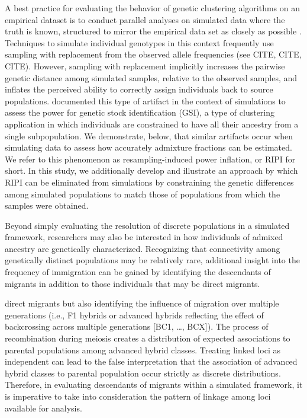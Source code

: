 A best practice for evaluating the behavior of genetic clustering algorithms on an empirical dataset is to conduct
parallel analyses on simulated data where the truth is known, structured to mirror the empirical data set
as closely as possible \citep{vaha2006efficiency,anderson2008improved,latch2011fine}.
Techniques to simulate individual genotypes in this context frequently use sampling with replacement from the 
observed allele frequencies (see CITE, CITE, CITE).
However, sampling with replacement implicitly increases the pairwise genetic distance among simulated samples, relative to the observed samples, and 
inflates the perceived ability to correctly assign individuals back to source populations. \citet{anderson2008improved}
documented this type of artifact in the context of simulations to assess the power for
genetic stock identification (GSI), a type of clustering application in which individuals are constrained to have
all their ancestry from a single subpopulation. We demonstrate, below, that similar artifacts occur when simulating data to 
assess how accurately admixture fractions can be estimated.  We refer to this phenomenon as resampling-induced
power inflation, or RIPI for short.  
In this study, we additionally develop and illustrate an approach by which RIPI can be eliminated
from simulations by constraining the genetic differences among simulated populations to match
those of populations from which the samples were obtained. 

Beyond simply evaluating the resolution of discrete populations in a simulated framework, researchers may also be 
interested in how individuals of admixed ancestry are genetically characterized.
Recognizing that connectivity among genetically distinct populations may be relatively rare, additional insight into the 
frequency of immigration can be gained by 
identifying the descendants of migrants in addition to those individuals that may be direct migrants.


 
direct migrants but also identifying the influence of migration over multiple generations (i.e., F1 hybrids or advanced hybrids reflecting the effect of backcrossing across multiple generations [BC1, \ldots, 
BCX]).
	The process of recombination during meiosis creates a distribution of expected associations to parental populations among advanced hybrid classes.
	Treating linked loci as independent can lead to the false interpretation that the association of advanced hybrid classes to parental population occur strictly as discrete distributions.
	Therefore, in evaluating descendants of migrants within a simulated framework, it is imperative to take into consideration the pattern of linkage among loci available for analysis.

